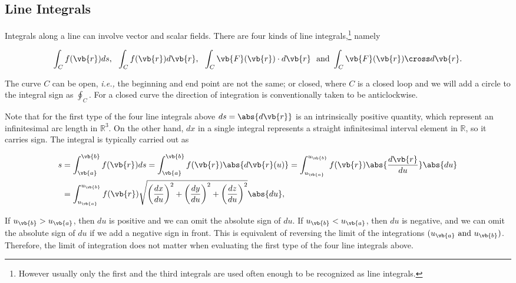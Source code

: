 \documentclass[english,a4paper,12pt]{report}
\begin{document}
\subsection{Line Integrals}

Integrals along a line can involve vector and scalar fields. There are four kinds of line integrals,\footnote{However usually only the first and the third integrals are used often enough to be recognized as line integrals.}  namely

\begin{equation}
	\int _{C} f(\vb{r} ) ds, ~~ \int_{C}^{} f(\vb{r} ) d\vb{r} , ~~ \int_{C}^{} \vb{F} (\vb{r} ) \cdot d\vb{r} ~ \text { and }  \int_{C}^{} \vb{F} (\vb{r} ) \cross d\vb{r} . 
\end{equation}

The curve \(C\) can be open, \textit{i.e.,} the beginning and end point are not the same; or closed, where \(C\) is a closed loop and we will add a circle to the integral sign as \(\oint_{C} \). For a closed curve the direction of integration is conventionally taken to be anticlockwise.

Note that for the first type of the four line integrals above \(ds = \abs{d \vb{r} } \) is an intrinsically positive quantity, which represent an infinitesimal arc length in \(\mathbb{R}^3 \). On the other hand, \(dx\) in a single integral represents a straight infinitesimal interval element in \(\mathbb{R}\), so it carries sign. The integral is typically carried out as

\begin{equation}
	\begin{aligned} 
	s &= \int_{\vb{a} }^{\vb{b} }f(\vb{r} )ds = \int_{\vb{a} }^{\vb{b} } f(\vb{r} )\abs{d \vb{r} (u)} = \int_{u_{\vb{a} } }^{u_{\vb{b} }  } f(\vb{r} )\abs{\frac{d\vb{r} }{du} } \abs{du}  \\
	&= \int_{u_{ \vb{a}} }^{u_{ \vb{b}} }f(\vb{r} ) \sqrt{\left( \frac{dx}{du}\right)^2 + \left( \frac{dy}{du}  \right)^2 + \left( \frac{dz}{du}  \right)^2} \abs{du},\\
	\end{aligned} 
\end{equation}

If \(u_{\vb{b} } > u_{\vb{a} }  \), then \(du\) is positive and we can omit the absolute sign of \(du\). If \(u_{\vb{b} } < u_{\vb{a} }  \), then \(du\) is negative, and we can omit the absolute sign of \(du\) if we add a negative sign in front. This is equivalent of reversing the limit of the integrations \((u_{\vb{a} } \text { and } u_{\vb{b} }  )\). Therefore, the limit of integration does not matter when evaluating the first type of the four line integrals above. 
\end{document}
